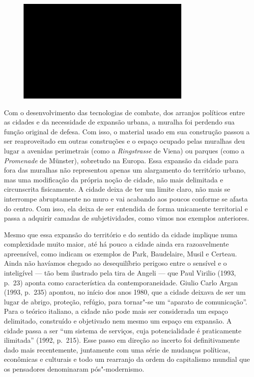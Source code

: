 \begin{figure}[!ht]

\centering
 \includegraphics[width=85mm]{./imgs/im1.jpg}
\caption{\tiny{}}

\end{figure}

Com o desenvolvimento das tecnologias de combate, dos arranjos políticos
entre as cidades e da necessidade de expansão urbana, a muralha foi perdendo
sua função original de defesa. Com isso, o material usado em sua
construção passou a ser reaproveitado em outras construções e o espaço
ocupado pelas muralhas deu lugar a avenidas perimetrais (como a
\emph{Ringstrasse} de Viena) ou parques (como a \emph{Promenade} de
Münster), sobretudo na Europa. Essa expansão da cidade para fora das
muralhas não representou apenas um alargamento do território urbano, mas
uma modificação da própria noção de cidade, não mais delimitada e
circunscrita fisicamente. A cidade deixa de ter um limite claro, não
mais se interrompe abruptamente no muro e vai acabando aos poucos
conforme se afasta do centro. Com isso, ela deixa de ser entendida de
forma unicamente territorial e passa a adquirir camadas de subjetividades,
como vimos nos exemplos anteriores.

Mesmo que essa expansão do território e do sentido da cidade implique
numa complexidade muito maior, até há pouco a cidade ainda era
razoavelmente apreensível, como indicam os exemplos de Park, Baudelaire,
Musil e Certeau. Ainda não havíamos chegado ao desequilíbrio perigoso
entre o sensível e o inteligível --- tão bem ilustrado pela tira de
Angeli --- que Paul Virilio (1993, p.~23) aponta como característica da
contemporaneidade. Giulio Carlo Argan (1993, p.~235) apontou, no início
dos anos 1980, que a cidade deixava de ser um lugar de abrigo, proteção,
refúgio, para tornar"-se um ``aparato de comunicação''. Para o teórico
italiano, a cidade não pode mais ser considerada um espaço delimitado,
construído e objetivado nem mesmo um espaço em expansão. A cidade passa
a ser ``um sistema de serviços, cuja potencialidade é praticamente
ilimitada'' (1992, p.~215). Esse passo em direção ao incerto foi
definitivamente dado mais recentemente, juntamente com uma série de
mudanças políticas, econômicas e culturais e todo um rearranjo da ordem
do capitalismo mundial que os pensadores denominaram pós"-modernismo.

